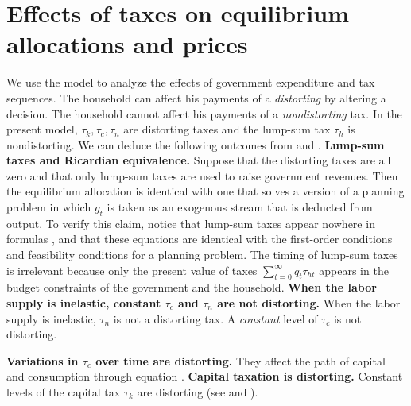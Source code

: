 \section{Effects of taxes on equilibrium allocations and prices}

   We use the model  to analyze the effects of
government expenditure and tax sequences.
The household can affect his payments of a {\it distorting\/}
by altering a decision. The household cannot affect his payments of a {\it nondistorting\/}
tax.
In the present model,  $\tau_k, \tau_c, \tau_n$ are distorting taxes
and the lump-sum tax $\tau_h$ is nondistorting.
%
%
We can deduce
 the following
outcomes
from  and .
\medskip
{}  {\bf Lump-sum taxes and Ricardian equivalence.}
Suppose that the distorting taxes are all zero and that
only lump-sum taxes are used to raise government revenues.  Then
the equilibrium allocation is identical with  one that solves a version
of  a
planning problem in which $g_t$ is taken as an exogenous
stream that is deducted from output.
To verify this claim, notice that lump-sum taxes appear nowhere
in formulas , and that these equations are identical
with the first-order conditions and feasibility conditions for
a planning problem.
The timing of lump-sum taxes is irrelevant because only
the present value of taxes $\sum_{t=0}^\infty q_t \tau_{ht}$ appears in
the budget constraints of the government and the household.
\medskip
{}  {\bf
When the labor supply is inelastic,
 constant $\tau_c$ and $\tau_n$ are not distorting.}
 When the labor supply is inelastic, $\tau_n$  is not
a distorting tax.    A  {\it constant\/} level of    $\tau_c$ is
not distorting.


\medskip
{}  {\bf Variations in $\tau_c$ over time are distorting.}
They affect the path of capital and consumption through equation
.
\medskip
{}  {\bf Capital taxation is distorting.}
 Constant levels of  the capital tax $\tau_k$ are distorting (see  and
).


%

